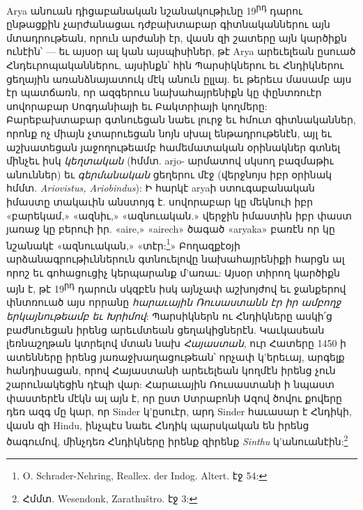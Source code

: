 \documentclass{article}
\begin{document}
{Arya անուան դիցաբանական նշանակութիւնը 19\textsuperscript{րդ} դարու ընթացքին չարժանացաւ դժբախտաբար գիտնականներու այն մտադրութեան, որուն արժանի էր, վասն զի շատերը այն կարծիքն ունէին՝ — եւ այսօր ալ կան այսպիսիներ, թէ Arya արեւելեան ըսուած Հնդեւրոպականներու, այսինքն՝ հին Պարսիկներու եւ Հնդիկներու ցեղային առանձնայատուկ մէկ անուն ըլլայ. եւ թերեւս մասամբ այս էր պատճառն, որ ազգերուս նախահայրենիքն կը փընտռուէր սովորաբար Սոգդանիայի եւ Բակտրիայի կողմերը: Բարեբախտաբար գտնուեցան նաեւ լուրջ եւ հմուտ գիտնականներ, որոնք ոչ միայն չտարուեցան նոյն սխալ ենթադրութենէն, այլ եւ աշխատեցան յաջողութեամբ համեմատական օրինակներ գտնել մինչեւ իսկ \emph{կեղտական} (հմմտ. arjo- արմատով սկսող բազմաթիւ անուններ) եւ \emph{գերմանական} ցեղերու մէջ (վերջնոյս իբր օրինակ հմմտ. \emph{Ariovistus, Ariobindus}): Ի հարկէ aryaի ստուգաբանական իմաստը տակաւին անստոյգ է. սովորաբար կը մեկնուի իբր «բարեկամ,» «ազնիւ,» «ազնուական.» վերջին իմաստին իբր փաստ յառաջ կը բերուի իր. «aire,» «airech» ծագած «aryaka» բառէն որ կը նշանակէ «ազնուական,» «տէր:\footnote{O. Schrader-Nehring, Reallex. der Indog. Altert. էջ 54:}» Բողազքէօյի արձանագրութիւններուն գտնուելովը նախահայրենիքի հարցն ալ որոշ եւ գոհացուցիչ կերպարանք մ'առաւ: Այսօր տիրող կարծիքն այն է, թէ 19\textsuperscript{րդ} դարուն սկզբէն իսկ այնչափ աշխոյժով եւ ջանքերով փնտռուած այս որրանը \emph{հարաւային Ռուսաստանն էր իր ամբողջ երկայնութեամբ եւ Խրիմով}: Պարսիկներն ու Հնդիկները ասկի՛ց բաժնուեցան իրենց արեւմտեան ցեղակիցներէն. Կաւկասեան լեռնաշղթան կտրելով մտան նախ \emph{Հայաստան}, ուր Հատերը 1450 ի ատենները իրենց յառաջխաղացութեան՝ որչափ կ'երեւայ, արգելք հանդիսացան, որով Հայաստանի արեւելեան կողմէն իրենց չուն շարունակեցին դէպի վար: Հարաւային Ռուսաստանի ի նպաստ փաստերէն մէկն ալ այն է, որ ըստ Ստրաբոնի Ազով ծովու քովերը դեռ ազգ մը կար, որ Sinder կ'ըսուէր, արդ Sinder հաւասար է Հնդիկի, վասն զի Hindu, ինչպէս նաեւ Հնդիկ պարսկական են իրենց ծագումով, մինչդեռ Հնդիկները իրենք զիրենք \emph{Sinthu} կ'անուանէին:\footnote{Հմմտ. Wesendonk, Zarathuštro. էջ 3:}

}
\end{document}
